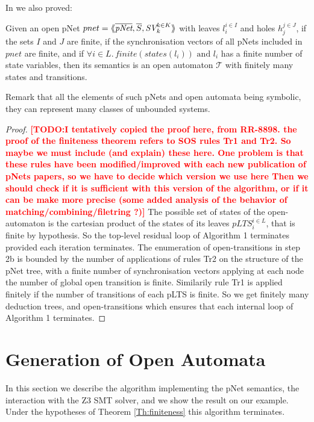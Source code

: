 \documentclass[smallcondensed]{svjour3}
\newcommand{\TODO}[1]{\textcolor{red}{\textbf{[TODO:#1]}}}
\begin{document}
In \cite{henrio:Forte2016} we also proved:
\begin{theorem}[Finiteness]
  \label{Th:finiteness}
  Given an open pNet $pnet=\mylangle \overline{\pNet},\overline{S}, \symb{SV}_k^{k\in K}\myrangle$ with leaves $l_i^{i\in I}$ and holes $h_j^{j\in
  J}$, if the sets $I$ and $J$ are finite, if the synchronisation vectors of all pNets 
  included in  $pnet$   are finite, and if
$\forall i \in L.\, finite{(states(l_i))} \text{ and } l_i$
has a finite number of state variables, then its semantics is an open automaton 
$\mathcal{T}$ with finitely many states and transitions.
\end{theorem}
  Remark that all the elements of such pNets and open automata being
symbolic, they can represent many classes of unbounded systems. 

\begin{proof}
  \TODO{I tentatively copied the proof here, from RR-8898.
the proof of the finiteness theorem refers to SOS rules Tr1 and
  Tr2. So maybe we must include (and explain) these here. One problem
  is that these rules have been modified/improved with each new
  publication of pNets papers, so we have to decide which version we
  use here
    Then we should
    check if it is sufficient with this version of the algorithm, or
    if it can be make more precise (some added analysis of the
    behavior of matching/combining/filetring ?)}
  The possible set of states of the open-automaton is the cartesian
  product of the states of its leaves $pLTS_i^{i\in L}$, that is finite by
  hypothesis. So the top-level residual loop of Algorithm 1 terminates provided each 
  iteration terminates. The enumeration of open-transitions in step 2b is bounded by the
  number of applications of rules Tr2 on the structure of the
  pNet tree, with a finite number of synchronisation vectors applying
  at each node the number of global open transition is finite. Similarily rule Tr1 is 
  applied finitely if the number
  of transitions of each pLTS is finite. So we get finitely many deduction trees, and
  open-transitions which ensures that each internal loop of Algorithm 1 terminates.
  \end{proof}

\section{Generation of Open Automata}
\label{section:implementation}
In this section we describe the algorithm implementing the pNet
semantics, the interaction with the Z3 SMT solver, and we show the
result on our example. Under the hypotheses of Theorem \ref{Th:finiteness}
this algorithm terminates. 
\end{document}
